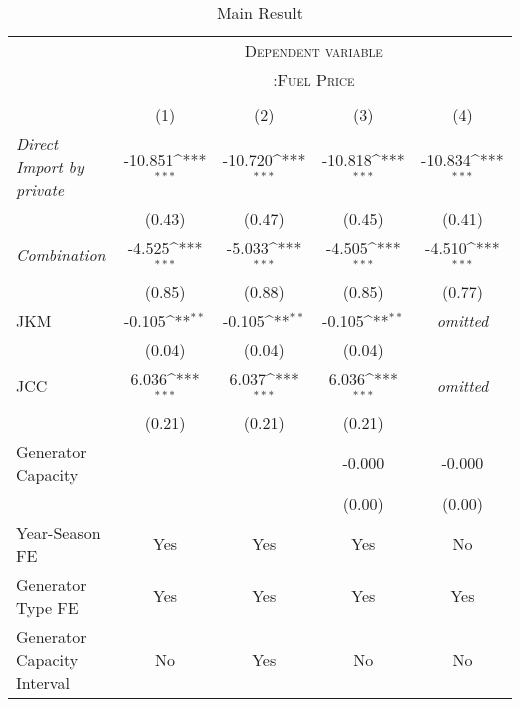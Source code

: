 \documentclass[12pt]{article}
\begin{document}
\begin{table}[htbp]\centering
\def\sym#1{\ifmmode^{#1}\else\(^{#1}\)\fi}
\caption{Main Result\label{tab1}}
\renewcommand{\arraystretch}{0.8}
\begin{tabular}{l*{4}{c}}
\toprule
 & \multicolumn{4}{c}{\textsc{Dependent variable}} \\ 
                     &\multicolumn{4}{c}{\textsc{:Fuel Price}}\\
                                          \cline{2-5}  \\
                    &\multicolumn{1}{c}{(1)}&\multicolumn{1}{c}{(2)}&\multicolumn{1}{c}{(3)}&\multicolumn{1}{c}{(4)}\\
\hline \hline
\addlinespace
\textit{Direct Import by private}              &     -10.851\sym{***}&     -10.720\sym{***}&     -10.818\sym{***}&     -10.834\sym{***}\\
                    &      (0.43)         &      (0.47)         &      (0.45)         &      (0.41)         \\
\addlinespace
\textit{Combination} &      -4.525\sym{***}&      -5.033\sym{***}&      -4.505\sym{***}&      -4.510\sym{***}\\
                    &      (0.85)         &      (0.88)         &      (0.85)         &      (0.77)         \\
\addlinespace
JKM                 &      -0.105\sym{**} &      -0.105\sym{**} &      -0.105\sym{**} &       \textit{omitted}         \\
                    &      (0.04)         &      (0.04)         &      (0.04)         &                 \\
\addlinespace
JCC                 &       6.036\sym{***}&       6.037\sym{***}&       6.036\sym{***}&       \textit{omitted}         \\
                    &      (0.21)         &      (0.21)         &      (0.21)         &                 \\
\addlinespace
Generator Capacity           &                     &                     &      -0.000         &      -0.000         \\
                    &                     &                     &      (0.00)         &      (0.00)         \\
\midrule
Year-Season FE         &    Yes &    Yes&    Yes&    No\\  
Generator Type FE        &    Yes &    Yes&    Yes&    Yes\\  
Generator Capacity Interval    &   No &    Yes&    No&    No\\  

\end{tabular}
\end{table}
\end{document}
